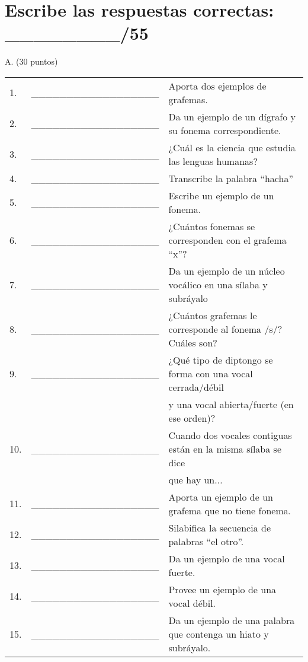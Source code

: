 \documentclass[12pt]{exam}
\begin{document}
\vspace{0.1in} 

\section{Escribe las respuestas correctas: \_\_\_\_\_\_\_\_/55}
\noindent \begin{bf}A. (30 puntos)\end{bf}

\renewcommand{\arraystretch}{1.63}
	\begin{tabular}{@{}lcp{1in}@{}}
	 1.  & \_\_\_\_\_\_\_\_\_\_\_\_\_\_\_\_\_\_ & Aporta dos ejemplos de grafemas.                           \\
	 2.  & \_\_\_\_\_\_\_\_\_\_\_\_\_\_\_\_\_\_ & Da un ejemplo de un dígrafo y su fonema correspondiente.   \\
	 3.  & \_\_\_\_\_\_\_\_\_\_\_\_\_\_\_\_\_\_ & ¿Cuál es la ciencia que estudia las lenguas humanas?       \\
	 4.  & \_\_\_\_\_\_\_\_\_\_\_\_\_\_\_\_\_\_ & Transcribe la palabra ``hacha''                                                                  \\
	 5.  & \_\_\_\_\_\_\_\_\_\_\_\_\_\_\_\_\_\_ & Escribe un ejemplo de un fonema.                                \\
	 6.  & \_\_\_\_\_\_\_\_\_\_\_\_\_\_\_\_\_\_ & ¿Cuántos fonemas se corresponden con el grafema ``x''?          \\
	 7.  & \_\_\_\_\_\_\_\_\_\_\_\_\_\_\_\_\_\_ & Da un ejemplo de un núcleo vocálico en una sílaba y subráyalo                              \\
	 8.  & \_\_\_\_\_\_\_\_\_\_\_\_\_\_\_\_\_\_ & ¿Cuántos grafemas le corresponde al fonema /s/? Cuáles son? \\
	 9.  & \_\_\_\_\_\_\_\_\_\_\_\_\_\_\_\_\_\_ & ¿Qué tipo de diptongo se forma con una vocal cerrada/débil \\ & & y una vocal abierta/fuerte (en ese orden)?                           \\
	 10. & \_\_\_\_\_\_\_\_\_\_\_\_\_\_\_\_\_\_ & Cuando dos vocales contiguas están en la misma sílaba se dice \\ & & que hay un...         \\
	 11. & \_\_\_\_\_\_\_\_\_\_\_\_\_\_\_\_\_\_ & Aporta un ejemplo de un grafema que no tiene fonema.            \\
	 12. & \_\_\_\_\_\_\_\_\_\_\_\_\_\_\_\_\_\_ & Silabifica la secuencia de palabras ``el otro''.        \\
	 13. & \_\_\_\_\_\_\_\_\_\_\_\_\_\_\_\_\_\_ & Da un ejemplo de una vocal fuerte.                     \\
	 14. & \_\_\_\_\_\_\_\_\_\_\_\_\_\_\_\_\_\_ & Provee un ejemplo de una vocal débil.                  \\
	 15. & \_\_\_\_\_\_\_\_\_\_\_\_\_\_\_\_\_\_ & Da un ejemplo de una palabra que contenga un hiato y subráyalo.     \\
\end{tabular}
		
\end{document}
